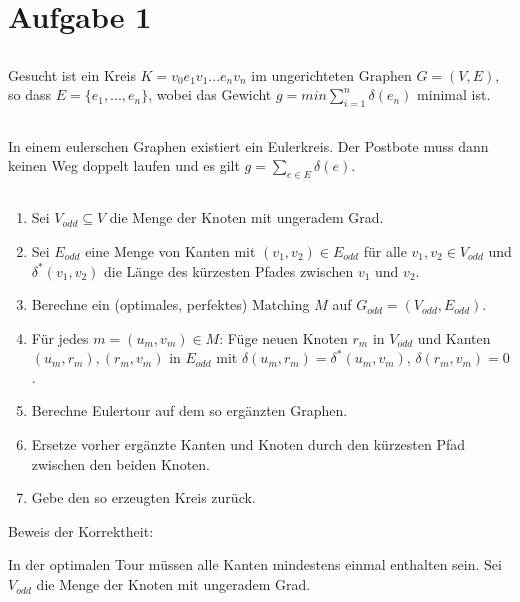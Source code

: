 \documentclass[a4paper]{article}
\begin{document}
\section{Aufgabe 1}

\subsection{}
Gesucht ist ein Kreis $K = v_0 e_1 v_1 ... e_n v_n$ im ungerichteten Graphen $G
= (V, E)$, so dass $E = \{ e_1, ..., e_n \}$, wobei das Gewicht
$g = min \sum\limits_{i=1}^{n} \delta(e_n)$ minimal ist.

\subsection{}
In einem eulerschen Graphen existiert ein Eulerkreis. Der Postbote muss dann
keinen Weg doppelt laufen und es gilt $g = \sum\limits_{e \in E} \delta(e)$.

\subsection{}
\begin{enumerate}
\item Sei $V_{odd} \subseteq V$ die Menge der Knoten mit ungeradem Grad.
\item Sei $E_{odd}$ eine Menge von Kanten mit $(v_1, v_2) \in E_{odd}$ für alle $v_1, v_2 \in V_{odd}$ und $\delta^*(v_1, v_2)$ die Länge des kürzesten Pfades zwischen $v_1$ und $v_2$.
\item Berechne ein (optimales, perfektes) Matching $M$ auf $G_{odd} = (V_{odd}, E_{odd})$.
\item Für jedes $m = (u_m, v_m) \in M$: Füge neuen Knoten $r_m$ in $V_{odd}$ und Kanten $(u_m, r_m), (r_m, v_m)$ in $E_{odd}$ mit $\delta(u_m, r_m) = \delta^*(u_m, v_m)$, $\delta(r_m, v_m) = 0$.
\item Berechne Eulertour auf dem so ergänzten Graphen.
\item Ersetze vorher ergänzte Kanten und Knoten durch den kürzesten Pfad zwischen den beiden Knoten.
\item Gebe den so erzeugten Kreis zurück.
\end{enumerate}

Beweis der Korrektheit:

In der optimalen Tour müssen alle Kanten mindestens einmal enthalten sein.
Sei $V_{odd}$ die Menge der Knoten mit ungeradem Grad.  
\end{document}
